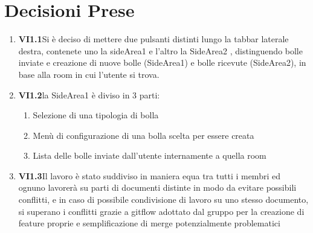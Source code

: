 \documentclass[10 pt,a4paper, openany]{article}
\begin{document}
\section{Decisioni Prese}
\begin{enumerate}
	\item \textbf{VI1.1}Si è deciso di mettere due pulsanti distinti lungo la tabbar laterale destra, contenete uno la sideArea1 e l'altro la SideArea2 , distinguendo bolle inviate e creazione di nuove bolle (SideArea1) e bolle ricevute (SideArea2), in base alla room in cui l'utente si trova.

	\item \textbf{VI1.2}la SideArea1 è diviso in 3 parti:
			\begin{enumerate}
				\item Selezione di una tipologia di bolla
				\item Menù di configurazione di una bolla scelta per essere creata
				\item Lista delle bolle inviate dall'utente internamente a quella room
			\end{enumerate}
			

	\item \textbf{VI1.3}Il lavoro è stato suddiviso in maniera equa tra tutti i membri ed ognuno lavorerà su parti di documenti distinte in modo da evitare possibili conflitti, e in caso di possibile condivisione di lavoro su uno stesso documento, si superano i conflitti grazie a gitflow adottato dal gruppo per la creazione di feature proprie e semplificazione di merge potenzialmente problematici 
	
	
\end{enumerate}
\end{document}
